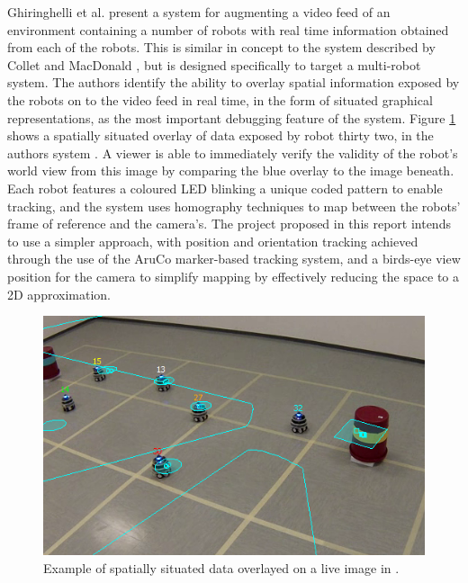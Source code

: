 \documentclass[titlepage,hidelinks,10pt]{article}
\begin{document}
Ghiringhelli et al. \cite{LEDSwarmAR} present a system for augmenting a video feed of an environment containing a number of robots with real time information obtained from each of the robots. This is similar in concept to the system described by Collet and MacDonald \cite{AugmentedRealityDebuggingSystem}, but is designed specifically to target a multi-robot system. The authors identify the ability to overlay spatial information exposed by the robots on to the video feed in real time, in the form of situated graphical representations, as the most important debugging feature of the system. Figure \ref{fig:SpatiallySituated} shows a spatially situated overlay of data exposed by robot thirty two, in the authors system \cite{LEDSwarmAR}. A viewer is able to immediately verify the validity of the robot's world view from this image by comparing the blue overlay to the image beneath. Each robot features a coloured LED blinking a unique coded pattern to enable tracking, and the system uses homography techniques to map between the robots' frame of reference and the camera's. The project proposed in this report intends to use a simpler approach, with position and orientation tracking achieved through the use of the AruCo \cite{AruCo} marker-based tracking system, and a birds-eye view position for the camera to simplify mapping by effectively reducing the space to a 2D approximation.

\begin{figure}[H]
	\begin{center}
	\includegraphics[scale=0.8]{SpatiallySituatedData.png}
	\caption{Example of spatially situated data overlayed on a live image in \cite{LEDSwarmAR}.}
	\label{fig:SpatiallySituated}
	\end{center}
\end{figure}
\end{document}

